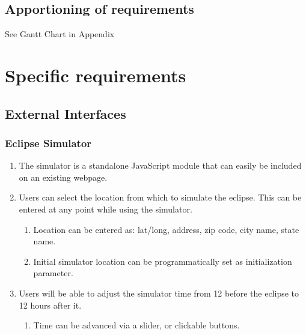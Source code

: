 \documentclass[10pt, onecolumn, draftclsnofoot, letterpaper, compsoc]{IEEEtran}
\begin{document}
\subsection{Apportioning of requirements}
See Gantt Chart in Appendix
	

\newpage
\section{Specific requirements}

\subsection{External Interfaces}

\subsubsection{Eclipse Simulator}
	\begin{enumerate}
		\item The simulator is a standalone JavaScript module that can easily 
		be included on an existing webpage.

		\item Users can select the location from which to simulate the eclipse. 
		This can be entered at any point while using the simulator.
		\begin{enumerate}
			\item Location can be entered as: lat/long, address, zip code, city 
			name, state name.
			\item Initial simulator location can be programmatically set as 
			initialization parameter.
		\end{enumerate}

		\item Users will be able to adjust the simulator time from 12 before 
		the eclipse to 12 hours after it.
		\begin{enumerate}
			\item Time can be advanced via a slider, or clickable buttons.
		\end{enumerate}

	\end{enumerate}
\end{document}
